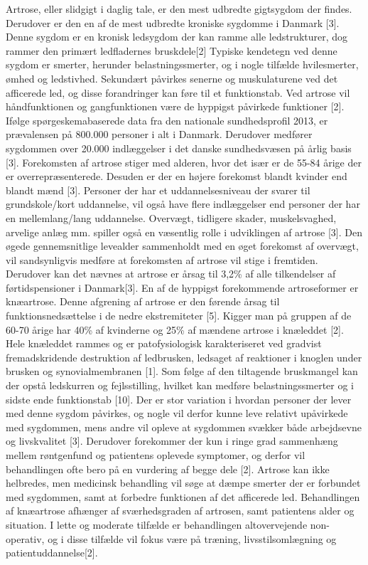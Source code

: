 Artrose, eller slidgigt i daglig tale, er den mest udbredte gigtsygdom der findes. Derudover er den en af de mest udbredte kroniske sygdomme i Danmark [3]. Denne sygdom er en kronisk ledsygdom der kan ramme alle ledstrukturer, dog rammer den primært ledfladernes bruskdele[2] 
Typiske kendetegn ved denne sygdom er smerter, herunder belastningssmerter, og i nogle tilfælde hvilesmerter, ømhed og ledstivhed. Sekundært påvirkes senerne og muskulaturene ved det afficerede led, og disse forandringer kan føre til et funktionstab. Ved artrose vil håndfunktionen og gangfunktionen være de hyppigst påvirkede funktioner [2]. 
Ifølge spørgeskemabaserede data fra den nationale sundhedsprofil 2013, er prævalensen på 800.000 personer i alt i Danmark. Derudover medfører sygdommen  over 20.000 indlæggelser i det danske sundhedsvæsen på årlig basis [3]. Forekomsten af artrose stiger med alderen, hvor det især er de 55-84 årige der er overrepræsenterede. Desuden er der en højere forekomst blandt kvinder end blandt mænd [3]. 
Personer der har et uddannelsesniveau der svarer til grundskole/kort uddannelse, vil også have flere indlæggelser end personer der har en mellemlang/lang uddannelse. Overvægt, tidligere skader, muskelsvaghed, arvelige anlæg mm. spiller også en væsentlig rolle i udviklingen af artrose [3]. Den øgede gennemsnitlige levealder sammenholdt med en øget forekomst af overvægt, vil sandsynligvis medføre at  forekomsten af artrose vil stige i fremtiden. Derudover kan det nævnes at artrose er årsag til 3,2\% af alle tilkendelser af førtidspensioner i Danmark[3].
En af de hyppigst forekommende artroseformer er knæartrose. Denne afgrening af artrose er den førende årsag til funktionsnedsættelse i de nedre ekstremiteter [5]. Kigger man på gruppen af de 60-70 årige har 40\% af kvinderne og 25\% af mændene artrose i knæleddet [2].
Hele knæleddet rammes og er patofysiologisk karakteriseret ved gradvist fremadskridende destruktion af ledbrusken, ledsaget af reaktioner i knoglen under brusken og synovialmembranen [1]. Som følge af den tiltagende bruskmangel kan der opstå ledskurren og fejlsstilling, hvilket kan medføre belastningssmerter og i sidste ende funktionstab [10].  
Der er stor variation i hvordan personer der lever med denne sygdom påvirkes, og nogle vil derfor kunne leve relativt upåvirkede med sygdommen, mens andre vil opleve at sygdommen svækker både arbejdsevne og livskvalitet [3]. Derudover forekommer der kun i ringe grad sammenhæng mellem røntgenfund og patientens oplevede symptomer, og derfor vil behandlingen ofte bero på en vurdering af begge dele [2].
Artrose kan ikke helbredes, men medicinsk behandling vil søge at dæmpe smerter der er forbundet med sygdommen, samt at forbedre funktionen af det afficerede led. Behandlingen af knæartrose afhænger af sværhedsgraden af artrosen, samt patientens alder og situation. I lette og moderate tilfælde er behandlingen altovervejende non-operativ, og i disse tilfælde vil fokus være på træning, livsstilsomlægning og patientuddannelse[2].

